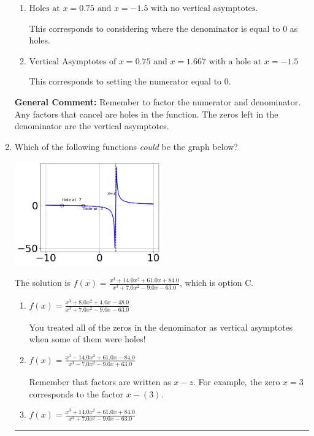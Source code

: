 \documentclass{extbook}[14pt]
\newcommand{\litem}[1]{\item #1

\rule{\textwidth}{0.4pt}}
\begin{document}
\begin{enumerate}
{\begin{enumerate}[label=\Alph*.]
This corresponds to mixing vertical and horizontal asymptotes.
\item \( \text{Holes at } x = 0.75 \text{ and } x = -1.5 \text{ with no vertical asymptotes.} \)

This corresponds to considering where the denominator is equal to 0 as holes.
\item \( \text{Vertical Asymptotes of } x = 0.75 \text{ and } x = 1.667 \text{ with a hole at } x = -1.5 \)

This corresponds to setting the numerator equal to 0.
\end{enumerate}

\textbf{General Comment:} Remember to factor the numerator and denominator. Any factors that cancel are holes in the function. The zeros left in the denominator are the vertical asymptotes.
}
\litem{
Which of the following functions \textit{could} be the graph below?

\begin{center}
    \includegraphics[width=0.5\textwidth]{../Figures/identifyGraphOfRationalFunctionCopyA.png}
\end{center}


The solution is \( f(x)=\frac{x^{3} +14.0 x^{2} +61.0 x + 84.0}{x^{3} +7.0 x^{2} -9.0 x -63.0} \), which is option C.\begin{enumerate}[label=\Alph*.]
\item \( f(x)=\frac{x^{3} +8.0 x^{2} +4.0 x -48.0}{x^{3} +7.0 x^{2} -9.0 x -63.0} \)

You treated all of the zeros in the denominator as vertical asymptotes when some of them were holes!
\item \( f(x)=\frac{x^{3} -14.0 x^{2} +61.0 x -84.0}{x^{3} -7.0 x^{2} -9.0 x + 63.0} \)

Remember that factors are written as $x-z$. For example, the zero $x=3$ corresponds to the factor $x-(3)$.
\item \( f(x)=\frac{x^{3} +14.0 x^{2} +61.0 x + 84.0}{x^{3} +7.0 x^{2} -9.0 x -63.0} \)


\end{enumerate}}
\end{enumerate}
\end{document}
